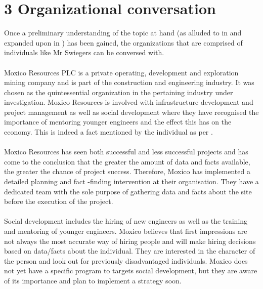 \chapter*{3 Organizational conversation}
\label{orgprog}
Once a preliminary understanding of the topic at hand (as alluded to in \textbf{} and expanded upon in \textbf{}) has been gained, the organizations that are comprised of individuals like Mr Swiegers can be conversed with.
\\\\
Moxico Resources PLC is a private operating, development and exploration mining company and is part of the construction and engineering industry. It was chosen as the quintessential organization in the pertaining industry under investigation. Moxico Resources is involved with infrastructure development and project management as well as social development where they have recognised the importance of mentoring younger engineers and the effect this has on the economy. This is indeed a fact mentioned by the individual as per \textbf{}.
\\\\
Moxico Resources has seen both successful and less successful projects and has come to the conclusion that the greater the amount of data and facts available, the greater the chance of project success. Therefore, Moxico has implemented a detailed planning and fact -finding intervention at their organisation. They have a dedicated team with the sole purpose of gathering data and facts about the site before the execution of the project.
\\\\
Social development includes the hiring of new engineers as well as the training and mentoring of younger engineers. Moxico believes that first impressions are not always the most accurate way of hiring people and will make hiring decisions based on data/facts about the individual. They are interested in the character of the person and look out for previously disadvantaged individuals. Moxico does not yet have a specific program to targets social development, but they are aware of its importance and plan to implement a strategy soon.
\\\\
